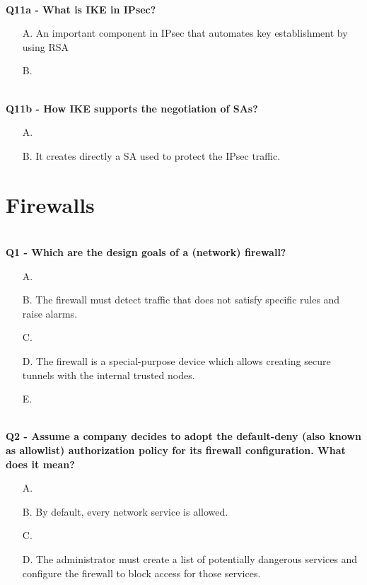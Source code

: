 \textbf{\\Q11a - What is IKE in IPsec?}
\begin{itemize}
    \item[A.] An important component in IPsec that automates key establishment by using RSA
    \item[B.] 
\end{itemize}
\textbf{\\Q11b - How IKE supports the negotiation of SAs?}
\begin{itemize}
    \item[A.] 
    \item[B.] It creates directly a SA used to protect the IPsec traffic.
\end{itemize}

\section{Firewalls}

\textbf{\\Q1 - Which are the design goals of a (network) firewall?}
\begin{itemize}
    \item[A.] 
    \item[B.] The firewall must detect traffic that does not satisfy specific rules and raise alarms.
    \item[C.] 
    \item[D.] The firewall is a special-purpose device which allows creating secure tunnels with the internal trusted nodes.
    \item[E.] 
\end{itemize}

\textbf{\\Q2 - Assume a company decides to adopt the default-deny (also known as allowlist) authorization policy for its firewall configuration. What does it mean?}
\begin{itemize}
    \item[A.] 
    \item[B.] By default, every network service is allowed.
    \item[C.] 
    \item[D.] The administrator must create a list of potentially dangerous services and configure the firewall to block access for those services.
\end{itemize}

